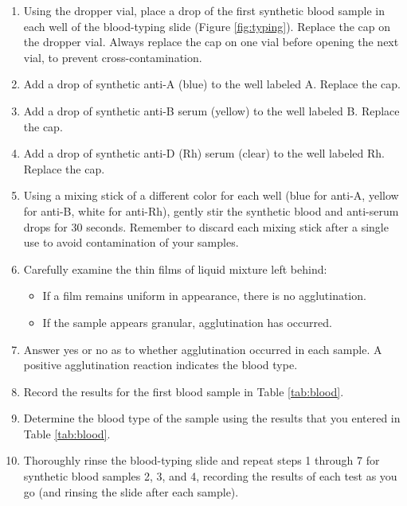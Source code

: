 \documentclass[]{book}
\providecommand{\tightlist}{%
  \setlength{\itemsep}{0pt}\setlength{\parskip}{0pt}}
\begin{document}
\begin{enumerate}
\def\labelenumi{\arabic{enumi}.}
\tightlist
\item
  Using the dropper vial, place a drop of the first synthetic blood sample in each well of the blood-typing slide (Figure \ref{fig:typing}). Replace the cap on the dropper vial. Always replace the cap on one vial before opening the next vial, to prevent cross-contamination.
\item
  Add a drop of synthetic anti-A (blue) to the well labeled A. Replace the cap.
\item
  Add a drop of synthetic anti-B serum (yellow) to the well labeled B. Replace the cap.
\item
  Add a drop of synthetic anti-D (Rh) serum (clear) to the well labeled Rh. Replace the cap.
\item
  Using a mixing stick of a different color for each well (blue for anti-A, yellow for anti-B, white for anti-Rh), gently stir the synthetic blood and anti-serum drops for 30 seconds. Remember to discard each mixing stick after a single use to avoid contamination of your samples.
\item
  Carefully examine the thin films of liquid mixture left behind:

  \begin{itemize}
  \tightlist
  \item
    If a film remains uniform in appearance, there is no agglutination.
  \item
    If the sample appears granular, agglutination has occurred.
  \end{itemize}
\item
  Answer yes or no as to whether agglutination occurred in each sample. A positive agglutination reaction indicates the blood type.
\item
  Record the results for the first blood sample in Table \ref{tab:blood}.
\item
  Determine the blood type of the sample using the results that you entered in Table \ref{tab:blood}.
\item
  Thoroughly rinse the blood-typing slide and repeat steps 1 through 7 for synthetic blood samples 2, 3, and 4, recording the results of each test as you go (and rinsing the slide after each sample).
\end{enumerate}
\end{document}
